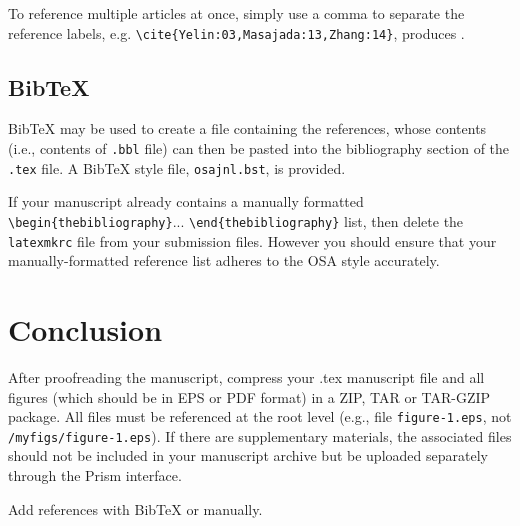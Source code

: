 \documentclass{osa-article}
\begin{document}
To reference multiple articles at once, simply use a comma to separate the reference labels, e.g. \verb+\cite{Yelin:03,Masajada:13,Zhang:14}+, produces \cite{Yelin:03,Masajada:13,Zhang:14}.

\subsection{Bib\TeX}
\label{sec:bibtex}
Bib\TeX{} may be used to create a file containing the references, whose contents (i.e., contents of \texttt{.bbl} file) can then be pasted into the bibliography section of the \texttt{.tex} file. A Bib\TeX{} style file, \texttt{osajnl.bst}, is provided.

If your manuscript already contains a manually formatted \verb|\begin{thebibliography}|... \verb|\end{thebibliography}| list, then delete the \texttt{latexmkrc} file from your submission files. However you should ensure that your manually-formatted reference list adheres to the OSA style accurately.

\section{Conclusion}
After proofreading the manuscript, compress your .tex manuscript file and all figures (which should be in EPS or PDF format) in a ZIP, TAR or TAR-GZIP package. All files must be referenced at the root level (e.g., file \texttt{figure-1.eps}, not \texttt{/myfigs/figure-1.eps}). If there are supplementary materials, the associated files should not be included in your manuscript archive but be uploaded separately through the Prism interface.


Add references with BibTeX or manually.
\cite{Zhang:14,OSA,FORSTER2007,Dean2006,testthesis,Yelin:03,Masajada:13,codeexample}




\end{document}
